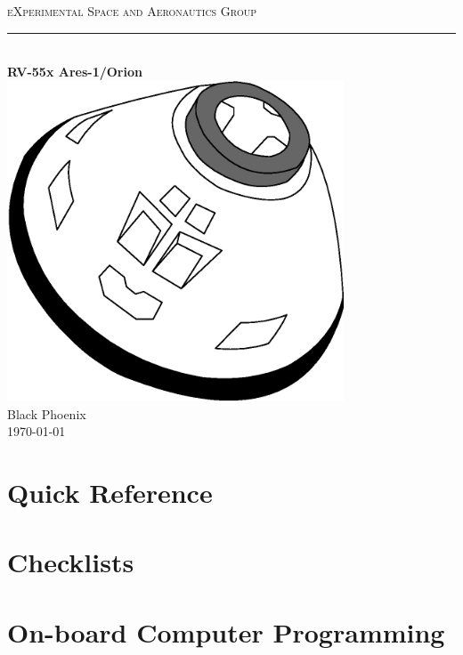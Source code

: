 \documentclass{report}
\begin{document}
\pagestyle{empty}

\begin{titlepage}
\begin{center}
\textsc{\LARGE eXperimental Space and Aeronautics Group}\\[0.2cm]
\rule{\linewidth}{0.5mm}\\[3.5cm]
{\huge \bfseries RV-55x Ares-1/Orion}\\[1.0cm]
\includegraphics[width=10cm]{../graphics/rv550_cover.eps}\\[2.0cm]
{\Large Black Phoenix}\\[1.5cm]
{\Large \today}
\end{center}
\end{titlepage}

\setcounter{tocdepth}{1}
\tableofcontents %
\cleardoublepage %

\pagestyle{plain} %


\chapter{Quick Reference}


\chapter{Checklists}


\chapter{On-board Computer Programming}

\end{document}
